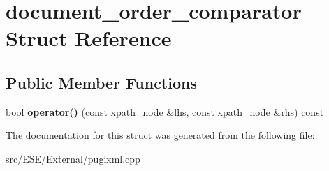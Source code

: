 \hypertarget{structdocument__order__comparator}{\section{document\-\_\-order\-\_\-comparator Struct Reference}
\label{structdocument__order__comparator}
}
\subsection*{Public Member Functions}
\begin{DoxyCompactItemize}
\item 
\hypertarget{structdocument__order__comparator_a11e471cbfa426bc9e48844c1db1a190e}{bool {\bfseries operator()} (const xpath\-\_\-node \&lhs, const xpath\-\_\-node \&rhs) const }\label{structdocument__order__comparator_a11e471cbfa426bc9e48844c1db1a190e}

\end{DoxyCompactItemize}


The documentation for this struct was generated from the following file\-:\begin{DoxyCompactItemize}
\item 
src/\-E\-S\-E/\-External/pugixml.\-cpp\end{DoxyCompactItemize}
